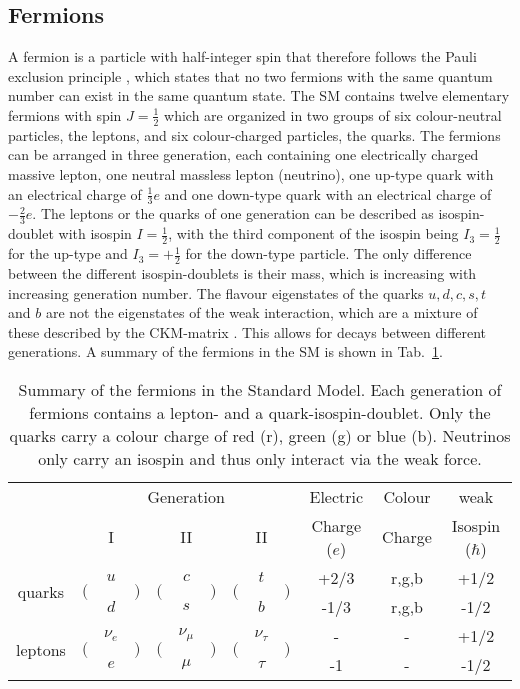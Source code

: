 \subsection{Fermions}
A fermion is a particle with half-integer spin that therefore follows the Pauli exclusion principle \cite{pauli}, which states that no two fermions with the same quantum number can exist in the same quantum state. The SM contains twelve elementary fermions with spin $J=\frac{1}{2}$ which are organized in two groups of six colour-neutral particles, the leptons, and six colour-charged particles, the quarks. The fermions can be arranged in three generation, each containing one electrically charged massive lepton, one neutral massless lepton (neutrino), one up-type quark with an electrical charge of $\frac{1}{3}e$ and one down-type quark with an electrical charge of $-\frac{2}{3}e$. The leptons or the quarks of one generation can be described as isospin-doublet with isospin $I=\frac{1}{2}$, with the third component of the isospin being $I_3=\frac{1}{2}$ for the up-type and $I_3=+\frac{1}{2}$ for the down-type particle. The only difference between the different isospin-doublets is their mass, which is increasing with increasing generation number. The flavour eigenstates of the quarks $u,d,c,s,t$ and $b$ are not the eigenstates of the weak interaction, which are a mixture of these described by the CKM-matrix \cite{CKM}. This allows for decays between different generations. 
A summary of the fermions in the SM is shown in Tab.~\ref{tab:theo:fermions}.\\
\begin{table}
	\centering
	\caption[Summary of the fermions in the Standard Model.]{Summary of the fermions in the Standard Model. Each generation of fermions contains a lepton- and a quark-isospin-doublet. Only the quarks carry a colour charge of red (r), green (g) or blue (b). Neutrinos only carry an isospin and thus only interact via the weak force.}
	\label{tab:theo:fermions}
	\begin{tabular}{crclrclrclccc}
	\hline
	& \multicolumn{9}{c}{Generation} & Electric & Colour &  weak \\
	& \multicolumn{3}{c}{I} & \multicolumn{3}{c}{II} & \multicolumn{3}{c}{II} & Charge ($e$) & Charge &  Isospin ($\hbar$) \\
	\hline
	\multirow{2}{*}{quarks} & \multirow{2}{*}{$\Big($} & $u$ & \multirow{2}{*}{$\Big)$} & \multirow{2}{*}{$\Big($} & $c$ & \multirow{2}{*}{$\Big)$} & \multirow{2}{*}{$\Big($} & $t$ & \multirow{2}{*}{$\Big)$} & +2/3 & r,g,b & +1/2 \\  
	 & & $d$ & & & $s$ & & & $b$ & & -1/3 & r,g,b & -1/2 \\ 
	\multirow{2}{*}{leptons}& \multirow{2}{*}{$\Big($} & $\nu_e$ & \multirow{2}{*}{$\Big)$} & \multirow{2}{*}{$\Big($} & $\nu_\mu$ & \multirow{2}{*}{$\Big)$} & \multirow{2}{*}{$\Big($} & $\nu_\tau$ & \multirow{2}{*}{$\Big)$} & - & - & +1/2 \\ 
	 & & $e$ & & & $\mu$ & & & $\tau$ & & -1 & - & -1/2 \\
	\hline
	\end{tabular}
\end{table}


